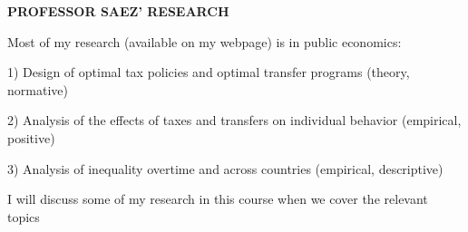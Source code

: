 \documentclass[landscape]{slides}
\begin{document}
\begin{slide}
\begin{center}
{\bf PROFESSOR SAEZ' RESEARCH}
\end{center}

Most of my research (available on my webpage) is in public economics:

1) Design of optimal tax policies and optimal transfer programs (theory, normative)

2) Analysis of the effects of taxes and transfers on individual behavior (empirical, positive)

3) Analysis of inequality overtime and across countries (empirical, descriptive)

I will discuss some of my research in this course when we cover the relevant topics


\end{slide}
\end{document}
